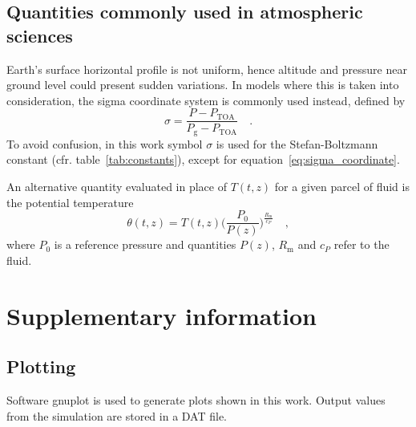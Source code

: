 \documentclass[a4paper,10pt,twocolumn,\classoptions]{article}
\newcommand{\PTOA}{P_\text{TOA}}
\begin{document}
\subsection{Quantities commonly used in atmospheric sciences}
\label{sec:Quantities commonly used in atmospheric sciences}
Earth's surface horizontal profile is not uniform, hence altitude and pressure near ground level could present sudden variations. In models where this is taken into consideration, the sigma coordinate system is commonly used instead, defined by
\begin{equation}
  \label{eq:sigma_coordinate}
  \sigma = \frac{P - \PTOA}{P_\text{g} - \PTOA}
  \quad .
\end{equation}
To avoid confusion, in this work symbol $\sigma$ is used for the Stefan-Boltzmann constant (cfr. table~\ref{tab:constants}), except for equation~\eqref{eq:sigma_coordinate}.

An alternative quantity evaluated in place of $T(t,z)$ for a given parcel of fluid is the potential temperature
\begin{equation}
  \label{eq:potential_temperature}
  \theta(t,z) = T(t,z) \bigg( \frac{P_0}{P(z)} \bigg)^\frac{R_\text{m}}{c_P}
  \quad ,
\end{equation}
where $P_0$ is a reference pressure and quantities $P(z)$, $R_\text{m}$ and $c_P$ refer to the fluid.



\section{Supplementary information}



\subsection{Plotting}
\label{sec:Plotting}
Software gnuplot is used to generate plots shown in this work. Output values from the simulation are stored in a DAT file.



\newpage
\printbibliography[heading=bibintoc]
\end{document}
